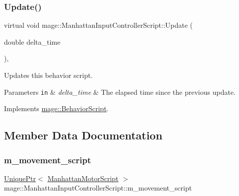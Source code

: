 \hypertarget{classmage_1_1_manhattan_input_controller_script_adfd98377642722fae5db6e005b2c6c3e}{}\label{classmage_1_1_manhattan_input_controller_script_adfd98377642722fae5db6e005b2c6c3e} 
\subsubsection{\texorpdfstring{Update()}{Update()}}
{\footnotesize\ttfamily virtual void mage\+::\+Manhattan\+Input\+Controller\+Script\+::\+Update (\begin{DoxyParamCaption}\item[{double}]{delta\+\_\+time }\end{DoxyParamCaption})\hspace{0.3cm}{\ttfamily [override]}, {\ttfamily [virtual]}}

Updates this behavior script.


\begin{DoxyParams}[1]{Parameters}
\mbox{\tt in}  & {\em delta\+\_\+time} & The elapsed time since the previous update. \\
\hline
\end{DoxyParams}


Implements \hyperlink{classmage_1_1_behavior_script_a905b6c83640cb91d19fecab3435f6feb}{mage\+::\+Behavior\+Script}.



\subsection{Member Data Documentation}
\hypertarget{classmage_1_1_manhattan_input_controller_script_ad3b6525bba021f03c17d2de6f5e54101}{}\label{classmage_1_1_manhattan_input_controller_script_ad3b6525bba021f03c17d2de6f5e54101} 
\subsubsection{\texorpdfstring{m\+\_\+movement\+\_\+script}{m\_movement\_script}}
{\footnotesize\ttfamily \hyperlink{namespacemage_a3316d7143a973e37adf1110f2e80ca31}{Unique\+Ptr}$<$ \hyperlink{classmage_1_1_manhattan_motor_script}{Manhattan\+Motor\+Script} $>$ mage\+::\+Manhattan\+Input\+Controller\+Script\+::m\+\_\+movement\+\_\+script\hspace{0.3cm}{\ttfamily [private]}}

